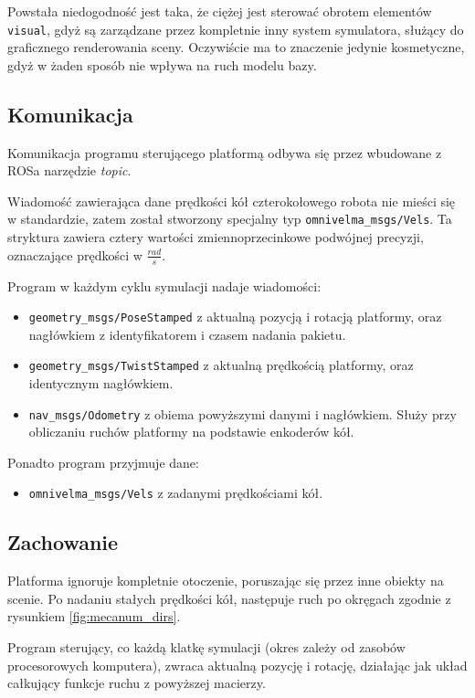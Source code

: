 		Powstała niedogodność jest taka, że ciężej jest sterować obrotem elementów \texttt{visual}, gdyż są zarządzane przez kompletnie inny system symulatora,
		służący do graficznego renderowania sceny.
		Oczywiście ma to znaczenie jedynie kosmetyczne, gdyż w żaden sposób nie wpływa na ruch modelu bazy.

	\subsection{Komunikacja}
		Komunikacja programu sterującego platformą odbywa się przez wbudowane z ROSa narzędzie \emph{topic}.

		Wiadomość zawierająca dane prędkości kół czterokołowego robota nie mieści się w standardzie, zatem został stworzony specjalny typ \texttt{omnivelma\_msgs/Vels}.
		Ta stryktura zawiera cztery wartości zmiennoprzecinkowe podwójnej precyzji, oznaczające prędkości w $\frac{rad}{s}$.

		Program w każdym cyklu symulacji nadaje wiadomości:
		\begin{itemize}
		\item \texttt{geometry\_msgs/PoseStamped} z aktualną pozycją i rotacją platformy, oraz nagłówkiem z identyfikatorem i czasem nadania pakietu.
		\item \texttt{geometry\_msgs/TwistStamped} z aktualną prędkością platformy, oraz identycznym nagłówkiem.
		\item \texttt{nav\_msgs/Odometry} z obiema powyższymi danymi i nagłówkiem. Służy przy obliczaniu ruchów platformy na podstawie enkoderów kół.
		\end{itemize}
		Ponadto program przyjmuje dane:
		\begin{itemize}
		\item \texttt{omnivelma\_msgs/Vels} z zadanymi prędkościami kół.
		\end{itemize}

	\subsection{Zachowanie}
		Platforma ignoruje kompletnie otoczenie, poruszając się przez inne obiekty na scenie.
		Po nadaniu stałych prędkości kół, następuje ruch po okręgach zgodnie z rysunkiem \ref{fig:mecanum_dirs}.

		Program sterujący, co każdą klatkę symulacji (okres zależy od zasobów procesorowych komputera), zwraca aktualną pozycję i rotację, 
		działając jak układ całkujący funkcje ruchu z powyższej macierzy.

